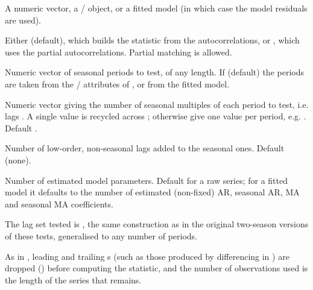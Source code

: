 \documentclass[a4paper]{book}
\begin{document}
\begin{Arguments}
\begin{ldescription}
\item[\code{x}] A numeric vector, a / object, or a fitted  model
(in which case the model residuals are used).

\item[\code{type}] Either  (default), which builds the statistic from
the autocorrelations, or , which uses the partial
autocorrelations. Partial matching is allowed.

\item[\code{season}] Numeric vector of seasonal periods to test, of any length. If
 (default) the periods are taken from the / attributes of
, or from the fitted model.

\item[\code{nlag}] Numeric vector giving the number of seasonal multiples of each
period to test, i.e. lags . A single value is recycled across
; otherwise give one value per period, e.g. . Default .

\item[\code{lags\_short}] Number of low-order, non-seasonal lags  added
to the seasonal ones. Default  (none).

\item[\code{npar}] Number of estimated model parameters. Default  for a raw
series; for a fitted  model it defaults to the number of estimated
(non-fixed) AR, seasonal AR, MA and seasonal MA coefficients.
\end{ldescription}
\end{Arguments}
%
\begin{Details}
The lag set tested is ,
the same construction as in the original two-season versions of these
tests, generalised to any number of periods.

As in , leading and trailing s (such as those produced by
differencing in ) are dropped () before
computing the statistic, and the number of observations used is the length
of the series that remains.
\end{Details}
%
\end{document}
